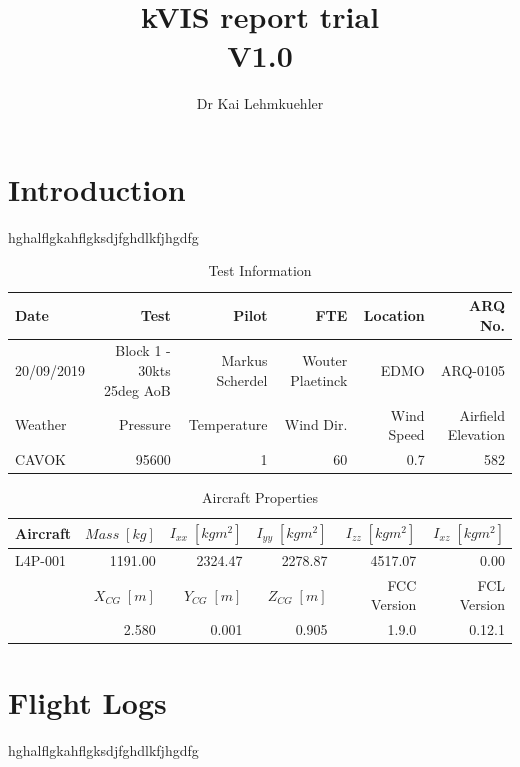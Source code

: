 \documentclass[11pt,a4paper]{article}
\author{Dr Kai Lehmkuehler}
\title{kVIS report trial\\ V1.0}
\begin{document}
\maketitle
\tableofcontents

\clearpage

\section{Introduction}
hghalflgkahflgksdjfghdlkfjhgdfg


\begin{table}[!h]
\begin{center}
\begin{tabular}{|l|r|r|r|r|r|}
\hline
Date & Test &  Pilot  &  FTE  &  Location & ARQ No. \\ 
\hline
20/09/2019 & Block 1 - 30kts 25deg AoB &  Markus Scherdel  &  Wouter Plaetinck  &  EDMO & ARQ-0105 \\ 
\hline
 Weather & Pressure &  Temperature  &  Wind Dir.   & Wind Speed  & Airfield Elevation \\ 
\hline
 CAVOK & 95600 &  1 &  60   & 0.7  & 582 \\ 
\hline
\end{tabular} 
\end{center}
\caption{Test Information}
\end{table}


\begin{table}[!h]
\begin{center}
\begin{tabular}{|l|r|r|r|r|r|}
\hline
Aircraft & $Mass\; [kg]$ &  $I_{xx}\; [kgm^2]$  &  $I_{yy}\; [kgm^2]$   &  $I_{zz}\; [kgm^2]$ & $I_{xz}\; [kgm^2]$ \\ 
\hline
L4P-001 & 1191.00 &  2324.47  &  2278.87  &  4517.07 & 0.00 \\ 
\hline
  & $X_{CG}\;[m]$ &  $Y_{CG}\;[m]$  &  $Z_{CG}\;[m]$   & FCC Version  & FCL Version \\ 
\hline
  & 2.580 &  0.001  &  0.905   & 1.9.0  & 0.12.1 \\ 
\hline
\end{tabular} 
\end{center}
\caption{Aircraft Properties}
\end{table}


\section{Flight Logs}
hghalflgkahflgksdjfghdlkfjhgdfg
\end{document}
